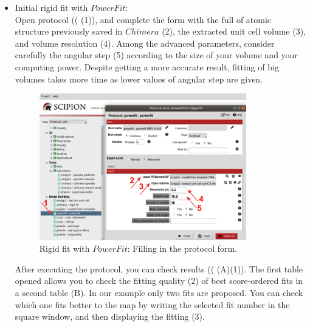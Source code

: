 \begin{itemize}
 \item Initial rigid fit with $PowerFit$:\\
 Open  protocol (( (1)), and complete the form with the full  of atomic structure previously saved in $Chimera$ (2), the extracted unit cell volume (3), and volume resolution (4). Among the advanced parameters, consider carefully the angular step (5) according to the size of your volume and your computing power. Despite getting a more accurate result, fitting of big volumes takes more time as  lower values of angular step are given.  
 
 \begin{figure}[H]
  \centering 
  \captionsetup{width=.7\linewidth} 
  \includegraphics[width=0.85\textwidth]{Images/Fig18}
  \caption{Rigid fit with $PowerFit$: Filling in the protocol form.}
  \label{fig:powerfit_protocol}
  \end{figure}
 
 After executing the  protocol, you can check results (( (A)(1)). The first table opened allows you to check the fitting quality (2) of best score-ordered fits in a second table (B). In our example only two fits are proposed. You can check which one fits better to the map by writing the selected fit number in the  square window, and then displaying the fitting (3).
 

\end{itemize}
